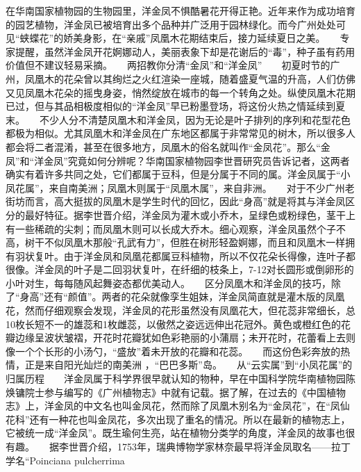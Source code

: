 \documentclass[zihao = -4]{exam-zh}
\begin{document}
       \begin{material}
       在华南国家植物园的生物园里，洋金凤不惧酷暑花开得正艳。近年来作为成功培育的园艺植物，洋金凤已被培育出多个品种并广泛用于园林绿化。而今广州处处可见“蛱蝶花”的娇美身影，在“亲戚”凤凰木花期结束后，接力延续夏日之美。　　专家提醒，虽然洋金凤开花婀娜动人，美丽表象下却是花谢后的“毒”，种子虽有药用价值但不建议轻易采摘。　　两招教你分清“金凤”和“洋金凤”　　初夏时节的广州，凤凰木的花朵曾以其绚烂之火红渲染一座城，随着盛夏气温的升高，人们仿佛又见凤凰木花朵的摇曳身姿，悄然绽放在城市的每一个转角之处。纵使凤凰木花期已过，但与其品相极度相似的“洋金凤”早已粉墨登场，将这份火热之情延续到夏末。　　不少人分不清楚凤凰木和洋金凤，因为无论是叶子排列的序列和花型花色都极为相似。尤其凤凰木和洋金凤在广东地区都属于非常常见的树木，所以很多人都会将二者混淆，甚至在很多地方，凤凰木的俗名就叫作“金凤花”。那么“金凤”和“洋金凤”究竟如何分辨呢？华南国家植物园李世晋研究员告诉记者，这两者确实有着许多共同之处，它们都属于豆科，但是分属于不同的属。洋金凤属于“小凤花属”，来自南美洲；凤凰木则属于“凤凰木属”，来自非洲。　　对于不少广州老街坊而言，高大挺拔的凤凰木是学生时代的回忆，因此“身高”就是将其与洋金凤区分的最好特征。据李世晋介绍，洋金凤为灌木或小乔木，呈绿色或粉绿色，茎干上有一些稀疏的尖刺；而凤凰木则可以长成大乔木。细心观察，洋金凤虽然个子不高，树干不似凤凰木那般“孔武有力”，但胜在树形轻盈婀娜，而且和凤凰木一样拥有羽状复叶。由于洋金凤和凤凰花都属豆科植物，所以不仅花朵长得像，连叶子都很像。洋金凤的叶子是二回羽状复叶，在纤细的枝条上，7-12对长圆形或倒卵形的小叶对生，每每随风起舞姿态都优美动人。　　区分凤凰木和洋金凤的技巧，除了“身高”还有“颜值”。两者的花朵就像孪生姐妹，洋金凤简直就是灌木版的凤凰花，然而仔细观察会发现，洋金凤的花形虽然没有凤凰花大，但花蕊非常细长，总10枚长短不一的雄蕊和1枚雌蕊，以傲然之姿远远伸出花冠外。黄色或橙红色的花瓣边缘呈波状皱褶，开花时花瓣犹如色彩艳丽的小蒲扇；未开花时，花蕾看上去则像一个个长形的小汤勺，“盛放”着未开放的花瓣和花蕊。　　而这份色彩奔放的热情，正是来自阳光灿烂的南美洲 ，“巴巴多斯”岛。　　从“云实属”到“小凤花属”的归属历程　　洋金凤属于科学界很早就认知的物种，早在中国科学院华南植物园陈焕镛院士参与编写的《广州植物志》中就有记载。据了解，在过去的《中国植物志》上，洋金凤的中文名也叫金凤花，然而除了凤凰木别名为“金凤花”，在“凤仙花科”还有一种花也叫金凤花，多次出现了重名的情况。所以在最新的植物志上，它被统一成“洋金凤”。既生瑜何生亮，站在植物分类学的角度，洋金凤的故事也很有趣。　　据李世晋介绍，1753年，瑞典博物学家林奈最早将洋金凤取名——拉丁学名“Poinciana pulcherrima 
\end{material}
\end{document}
